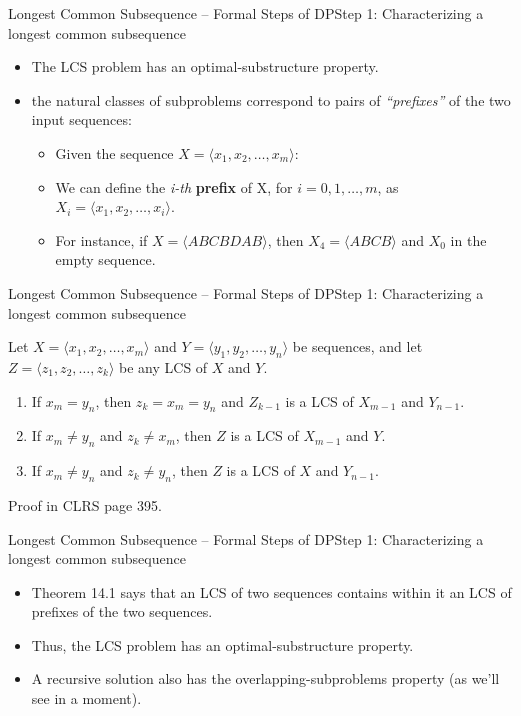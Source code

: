 \documentclass[aspectratio=169]{beamer}
\newcommand{\toRight}[1]{
    \begin{FlushRight}
        {\small #1}
    \end{FlushRight}
}
\begin{document}
\begin{frame}{Longest Common Subsequence -- Formal Steps of DP}{Step 1: Characterizing a longest common subsequence}
    \begin{itemize}
        \item The LCS problem has an optimal-substructure property.
        \item the natural classes of subproblems correspond to pairs of \textit{``prefixes''} of the two input sequences:
        \begin{itemize}
            \item Given the sequence $X=\langle x_1, x_2, \ldots, x_m\rangle$:
            \item We can define the \textit{i-th} \textbf{prefix} of X, for $i = 0, 1, \ldots, m$, as $X_i = \langle x_1, x_2, \ldots, x_i\rangle$.
            \item For instance, if $X = \langle A B C B D A B \rangle$, then $X_4 = \langle A B C B \rangle$ and $X_0$ in the empty sequence.
        \end{itemize}
    \end{itemize}
\end{frame}

\begin{frame}{Longest Common Subsequence -- Formal Steps of DP}{Step 1: Characterizing a longest common subsequence}
    \begin{tcolorbox}[title=Theorem 14.1 (Optimal substructure of an LCS)]
        Let $X=\langle x_1, x_2, \ldots, x_m\rangle$ and $Y=\langle y_1, y_2, \ldots, y_n\rangle$ be sequences, and let $Z=\langle z_1, z_2, \ldots, z_k\rangle$ be any LCS of $X$ and $Y$.
        \begin{enumerate}
            \item If $x_m = y_n$, then $z_k = x_m = y_n$ and $Z_{k - 1}$ is a LCS of $X_{m-1}$ and $Y_{n-1}$. \pause
            \item If $x_m \neq y_n$ and $z_k \neq x_m$, then $Z$ is a LCS of $X_{m-1}$ and $Y$. \pause
            \item If $x_m \neq y_n$ and $z_k \neq y_n$, then $Z$ is a LCS of $X$ and $Y_{n-1}$.
        \end{enumerate}
    \end{tcolorbox}
    \toRight{Proof in CLRS page 395.}
\end{frame}

\begin{frame}{Longest Common Subsequence -- Formal Steps of DP}{Step 1: Characterizing a longest common subsequence}
    \begin{itemize}
        \item Theorem 14.1 says that an LCS of two sequences contains within it an LCS of prefixes of the two sequences.
        \item Thus, the LCS problem has an optimal-substructure property.
        \item A recursive solution also has the overlapping-subproblems property (as we’ll see in a moment).
    \end{itemize}
\end{frame}
\end{document}
